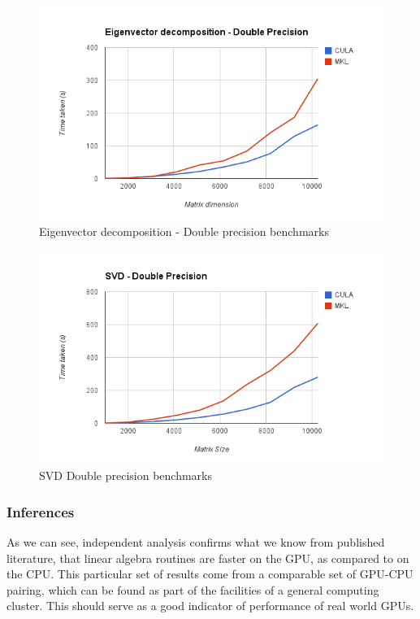 \documentclass[submit]{aiaa-tc_mod}%
\begin{document}
\begin{figure}[H]
 \includegraphics[width=\textwidth]{dsyev_bench.png}
 \caption{Eigenvector decomposition - Double precision benchmarks }
 \label{eigenbench}
\end{figure}

\begin{figure}[H]
 \includegraphics[width=\textwidth]{dgesvd_bench.png}
 \caption{SVD  Double precision benchmarks }
 \label{svdbench}
\end{figure}


\subsubsection{Inferences}
As we can see, independent analysis confirms what we know from published literature, that linear algebra routines are faster on the GPU, as compared to on the CPU. This particular set of results come from a comparable set of GPU-CPU pairing, which can be found as part of the facilities of a general computing cluster. This should serve as a good indicator of performance of real world GPUs.
\end{document}
